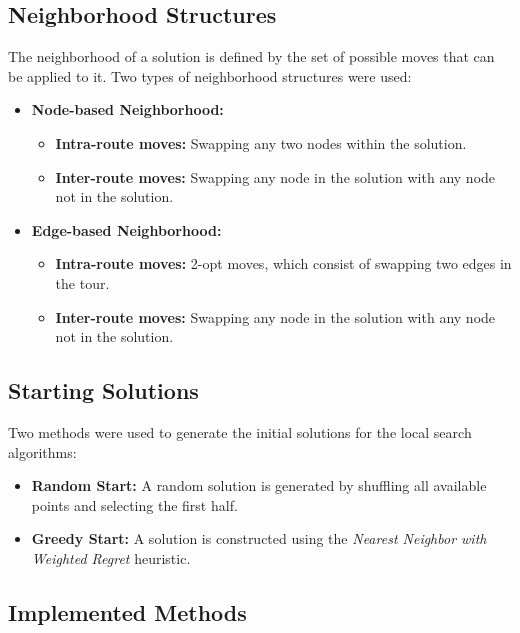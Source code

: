 \newpage

\subsection{Neighborhood Structures}

The neighborhood of a solution is defined by the set of possible moves that can be applied to it. Two types of neighborhood structures were used:

\begin{itemize}
    \item \textbf{Node-based Neighborhood:}
    \begin{itemize}
        \item \textbf{Intra-route moves:} Swapping any two nodes within the solution.
        \item \textbf{Inter-route moves:} Swapping any node in the solution with any node not in the solution.
    \end{itemize}
    \item \textbf{Edge-based Neighborhood:}
    \begin{itemize}
        \item \textbf{Intra-route moves:} 2-opt moves, which consist of swapping two edges in the tour.
        \item \textbf{Inter-route moves:} Swapping any node in the solution with any node not in the solution.
    \end{itemize}
\end{itemize}

\subsection{Starting Solutions}

Two methods were used to generate the initial solutions for the local search algorithms:

\begin{itemize}
    \item \textbf{Random Start:} A random solution is generated by shuffling all available points and selecting the first half.
    \item \textbf{Greedy Start:} A solution is constructed using the \textit{Nearest Neighbor with Weighted Regret} heuristic.
\end{itemize}

\subsection{Implemented Methods}

